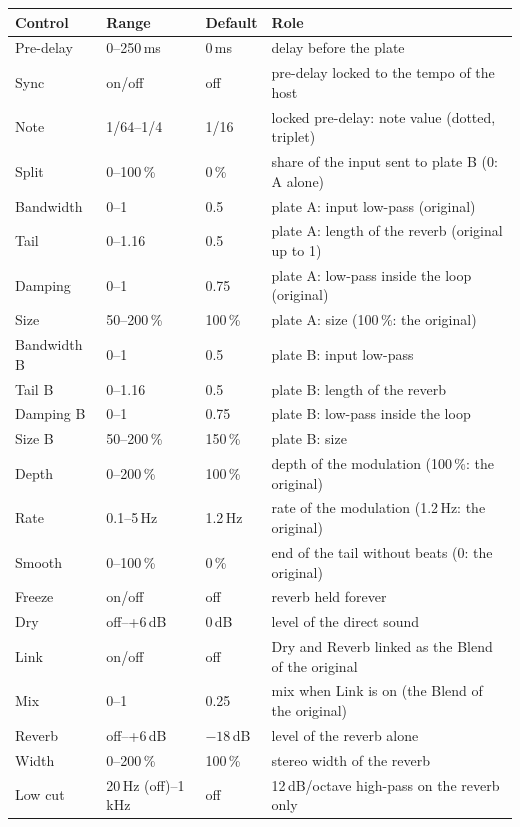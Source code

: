 \documentclass[a4paper,11pt]{article}
\newcommand{\dB}{\,dB}
\begin{document}
\begin{center}
\small
\begin{tabularx}{\textwidth}{@{}l l l X@{}}
\toprule
Control & Range & Default & Role \\
\midrule
Pre-delay & 0--250\,ms & 0\,ms & delay before the plate \\
Sync & on/off & off & pre-delay locked to the tempo of the host \\
Note & 1/64--1/4 & 1/16 & locked pre-delay: note value (dotted, triplet) \\
Split & 0--100\,\% & 0\,\% & share of the input sent to plate B (0: A alone) \\
Bandwidth & 0--1 & 0.5 & plate A: input low-pass (original) \\
Tail & 0--1.16 & 0.5 & plate A: length of the reverb (original up to 1) \\
Damping & 0--1 & 0.75 & plate A: low-pass inside the loop (original) \\
Size & 50--200\,\% & 100\,\% & plate A: size (100\,\%: the original) \\
Bandwidth B & 0--1 & 0.5 & plate B: input low-pass \\
Tail B & 0--1.16 & 0.5 & plate B: length of the reverb \\
Damping B & 0--1 & 0.75 & plate B: low-pass inside the loop \\
Size B & 50--200\,\% & 150\,\% & plate B: size \\
Depth & 0--200\,\% & 100\,\% & depth of the modulation (100\,\%: the original) \\
Rate & 0.1--5\,Hz & 1.2\,Hz & rate of the modulation (1.2\,Hz: the original) \\
Smooth & 0--100\,\% & 0\,\% & end of the tail without beats (0: the original) \\
Freeze & on/off & off & reverb held forever \\
Dry & off--+6\dB & 0\dB & level of the direct sound \\
Link & on/off & off & Dry and Reverb linked as the Blend of the original \\
Mix & 0--1 & 0.25 & mix when Link is on (the Blend of the original) \\
Reverb & off--+6\dB & $-18$\dB & level of the reverb alone \\
Width & 0--200\,\% & 100\,\% & stereo width of the reverb \\
Low cut & 20\,Hz (off)--1\,kHz & off & 12\dB/octave high-pass on the reverb only \\

\end{tabularx}
\end{center}
\end{document}
